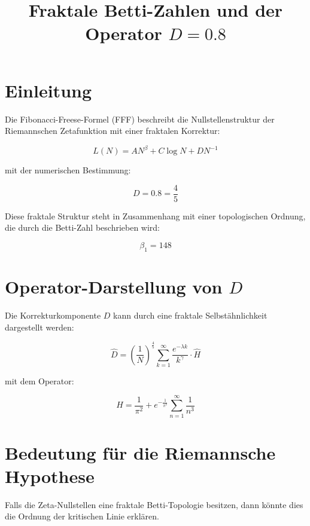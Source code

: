 \documentclass[a4paper,12pt]{article}
\begin{document}
\title{Fraktale Betti-Zahlen und der Operator \( D = 0.8 \)}
\author{}
\date{}
\maketitle

\section{Einleitung}
Die Fibonacci-Freese-Formel (FFF) beschreibt die Nullstellenstruktur der Riemannschen Zetafunktion mit einer fraktalen Korrektur:

\[
L(N) = A N^\beta + C \log N + D N^{-1}
\]

mit der numerischen Bestimmung:

\[
D = 0.8 = \frac{4}{5}
\]

Diese fraktale Struktur steht in Zusammenhang mit einer topologischen Ordnung, die durch die Betti-Zahl beschrieben wird:

\[
\beta_1 = 148
\]

\section{Operator-Darstellung von \( D \)}
Die Korrekturkomponente \( D \) kann durch eine fraktale Selbstähnlichkeit dargestellt werden:

\[
\hat{D} = \left( \frac{1}{N} \right)^{\frac{4}{5}} \sum_{k=1}^{\infty} \frac{e^{-\lambda k}}{k^{\gamma}} \cdot \hat{H}
\]

mit dem Operator:

\[
\hat{H} = \frac{1}{\pi^2} + e^{-\frac{1}{\pi^2}} \sum_{n=1}^{\infty} \frac{1}{n^3}
\]

\section{Bedeutung für die Riemannsche Hypothese}
Falls die Zeta-Nullstellen eine fraktale Betti-Topologie besitzen, dann könnte dies die Ordnung der kritischen Linie erklären.
\end{document}
